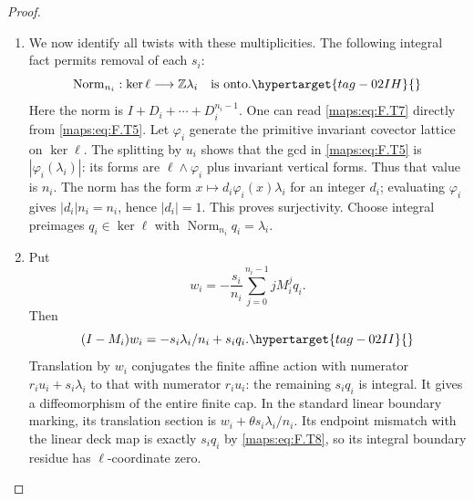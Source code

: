 \documentclass[11pt,a4paper]{article}
\numberwithin{equation}{section}
\theoremstyle{definition}
\begin{document}
\begin{proof}
\begin{enumerate}[label=\arabic*.]
\item We now identify all twists with these multiplicities.
The following integral fact permits removal of each $s_i$:
\begin{equation}
 \operatorname{Norm}_{n_i}:
 \ker\ell\longrightarrow\mathbb Z\lambda_i
 \quad\text{is onto}.
 \hypertarget{tag-02IH}{}\label{maps:eq:F.T7}
\end{equation}
Here the norm is $I+D_i+\cdots+D_i^{n_i-1}$.
One can read \eqref{maps:eq:F.T7} directly from \eqref{maps:eq:F.T5}.
Let $\varphi_i$ generate the primitive invariant covector
lattice on $\ker\ell$.
The splitting by $u_i$ shows that the gcd in \eqref{maps:eq:F.T5} is
$|\varphi_i(\lambda_i)|$: its forms are
$\ell\wedge\varphi_i$ plus invariant vertical forms.
Thus that value is $n_i$.
The norm has the form
$x\mapsto d_i\varphi_i(x)\lambda_i$ for an integer
$d_i$; evaluating $\varphi_i$ gives
$|d_i|n_i=n_i$, hence $|d_i|=1$.
This proves surjectivity. Choose integral preimages
$q_i\in\ker\ell$ with
$\operatorname{Norm}_{n_i}q_i=\lambda_i$.

\item Put
\[
 w_i=-\frac{s_i}{n_i}\sum_{j=0}^{n_i-1}jM_i^j q_i.
\]
Then
\begin{equation}
 (I-M_i)w_i=-s_i\lambda_i/n_i+s_iq_i.
 \hypertarget{tag-02II}{}\label{maps:eq:F.T8}
\end{equation}
Translation by $w_i$ conjugates the finite affine action
with numerator $r_i u_i+s_i\lambda_i$ to that with
numerator $r_i u_i$: the remaining $s_iq_i$ is integral.
It gives a diffeomorphism of the entire finite cap.
In the standard linear boundary marking, its translation
section is
$w_i+\theta s_i\lambda_i/n_i$.
Its endpoint mismatch with the linear deck map is exactly
$s_iq_i$ by \eqref{maps:eq:F.T8}, so its integral boundary residue has
$\ell$-coordinate zero.


\end{enumerate}
\end{proof}
\end{document}
